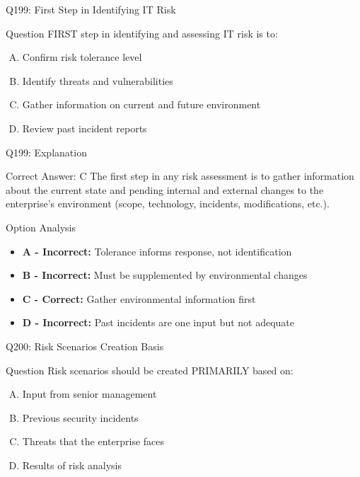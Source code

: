 \documentclass{beamer}
\begin{document}
	\begin{frame}{Q199: First Step in Identifying IT Risk}
		\begin{block}{Question}
			FIRST step in identifying and assessing IT risk is to:
		\end{block}
		\begin{enumerate}[(A)]
			\item Confirm risk tolerance level
			\item Identify threats and vulnerabilities
			\item Gather information on current and future environment
			\item Review past incident reports
		\end{enumerate}
	\end{frame}
	
	\begin{frame}{Q199: Explanation}
		\begin{block}{Correct Answer: C}
			The first step in any risk assessment is to gather information about the current state and pending internal and external changes to the enterprise's environment (scope, technology, incidents, modifications, etc.).
		\end{block}
		\begin{block}{Option Analysis}
			\begin{itemize}
				\item \textbf{A - Incorrect:} Tolerance informs response, not identification
				\item \textbf{B - Incorrect:} Must be supplemented by environmental changes
				\item \textbf{C - Correct:} Gather environmental information first
				\item \textbf{D - Incorrect:} Past incidents are one input but not adequate
			\end{itemize}
		\end{block}
	\end{frame}
	
	\begin{frame}{Q200: Risk Scenarios Creation Basis}
		\begin{block}{Question}
			Risk scenarios should be created PRIMARILY based on:
		\end{block}
		\begin{enumerate}[(A)]
			\item Input from senior management
			\item Previous security incidents
			\item Threats that the enterprise faces
			\item Results of risk analysis
		\end{enumerate}
	\end{frame}
	
\end{document}
